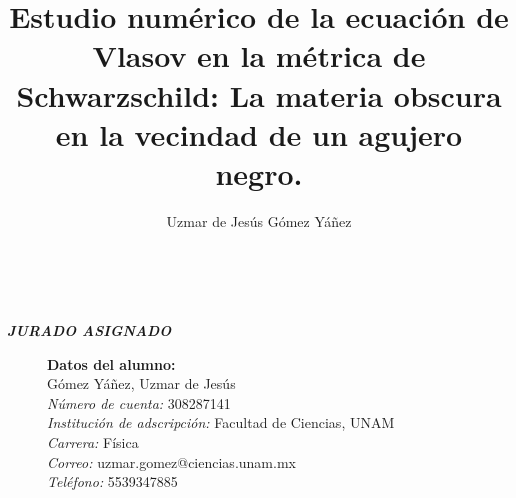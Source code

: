 \documentclass[11pt,twoside,openright,spanish]{report}
\numberwithin{equation}{chapter}
\numberwithin{figure}{chapter}
\numberwithin{table}{chapter}
\renewcommand{\baselinestretch}{1.5}
\newenvironment{changemargin}[3]{
	\begin{list}{}{
			\setlength{\topsep}{#3}
			\setlength{\leftmargin}{#1}
			\setlength{\rightmargin}{#2}
			\setlength{\listparindent}{\parindent}
			\setlength{\itemindent}{\parindent}
			\setlength{\parsep}{\parskip}
		}
		\item[]}{\end{list}}
\begin{document}
	
\renewcommand{\baselinestretch}{1}

\graphicspath{{./images/}}

\title{Estudio numérico de la ecuación de Vlasov en la métrica de Schwarzschild: La materia obscura en la vecindad de un agujero negro.}
\author{Uzmar de Jesús Gómez Yáñez}
\maketitle

\newpage
$\ $
\thispagestyle{empty} %

\begin{changemargin}{1cm}{0cm}{1cm}
	
	\vspace{30cm} 
	\begin{center}
		\textit{\textbf{\Large JURADO ASIGNADO}}
	\end{center}
	\vspace{1cm}
	\noindent
	\begin{description}
		\item[]\textbf{Datos del alumno:}\\
		Gómez Yáñez, Uzmar de Jesús\\
		\textit{Número de cuenta:} 308287141\\
		\textit{Institución de adscripción:} Facultad de Ciencias, UNAM\\
		\textit{Carrera:} Física\\
		\textit{Correo:} uzmar.gomez@ciencias.unam.mx\\
		\textit{Teléfono:} 5539347885
		\vspace{1cm}
		

\end{description}
\end{changemargin}
\end{document}
